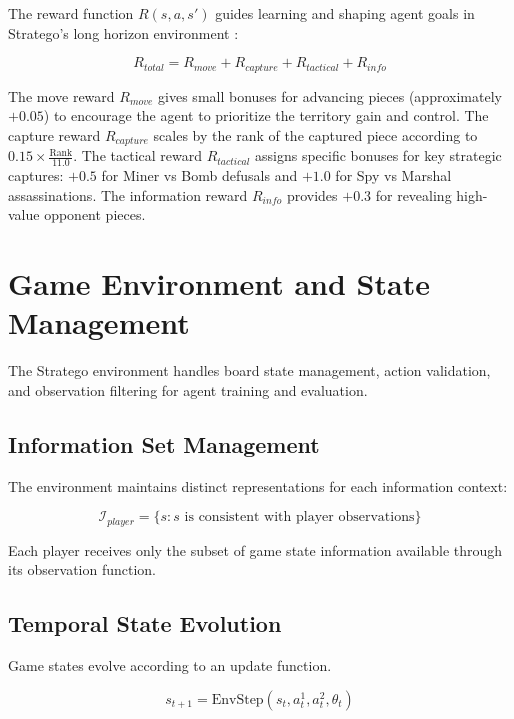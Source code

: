 The reward function $R(s, a, s')$ guides learning and shaping agent goals in Stratego's long horizon environment \cite{PBRSModern2022}:

\begin{equation}
R_{total} = R_{move} + R_{capture} + R_{tactical} + R_{info}
\end{equation}

The move reward $R_{move}$ gives small bonuses for advancing pieces (approximately $+0.05$) to encourage the agent to prioritize the territory gain and control. The capture reward $R_{capture}$ scales by the rank of the captured piece according to $0.15 \times \frac{\text{Rank}}{11.0}$. The tactical reward $R_{tactical}$ assigns specific bonuses for key strategic captures: $+0.5$ for Miner vs Bomb defusals and $+1.0$ for Spy vs Marshal assassinations. The information reward $R_{info}$ provides $+0.3$ for revealing high-value opponent pieces.


\section{Game Environment and State Management}

The Stratego environment handles board state management, action validation, and observation filtering for agent training and evaluation.

\subsection{Information Set Management}
The environment maintains distinct representations for each information context:

\begin{equation}
\mathcal{I}_{player} = \{s : s \text{ is consistent with player observations}\}
\end{equation}

Each player receives only the subset of game state information available through its observation function.

\subsection{Temporal State Evolution}
Game states evolve according to an update function.

\begin{equation}
s_{t+1} = \text{EnvStep}(s_t, a_t^1, a_t^2, \theta_t)
\end{equation}

